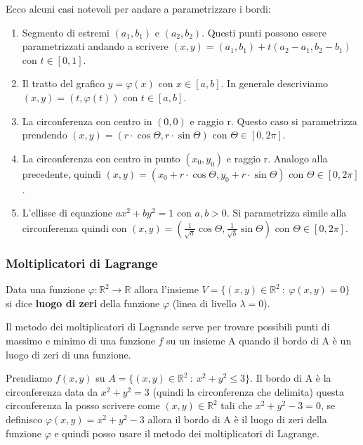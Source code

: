 \hspace{-15pt}Ecco alcuni casi notevoli per andare a parametrizzare i bordi:
\begin{enumerate}
    \item Segmento di estremi $(a_1,b_1)$ e $(a_2,b_2)$. Questi punti possono essere parametrizzati andando a scrivere $(x,y) = (a_1,b_1) + t(a_2-a_1, b_2 - b_1)$ con $t \in [0,1]$.
    \item Il tratto del grafico $y = \varphi(x)$ con $x \in [a,b]$. In generale descriviamo $(x,y) = (t, \varphi(t))$ con $t \in [a,b]$.
    \item La circonferenza con centro in $(0,0)$ e raggio r. Questo caso si parametrizza prendendo $(x,y) = (r \cdot \cos{\Theta}, r \cdot \sin{\Theta})$ con $\Theta \in [0,2\pi]$.
    \item La circonferenza con centro in punto $(x_0, y_0)$ e raggio r. Analogo alla precedente, quindi $(x,y) = (x_0 + r \cdot \cos{\Theta}, y_0 + r\cdot \sin{\Theta})$ con $\Theta \in [0,2\pi]$.
    \item L'ellisse di equazione $ax^2 + by^2 = 1$ con $a,b > 0$. Si parametrizza simile alla circonferenza quindi con $(x,y) = (\frac{1}{\sqrt{a}}\cos{\Theta}, \frac{1}{\sqrt{b}}\sin{\Theta})$ con $\Theta \in [0,2\pi]$.
\end{enumerate}
\subsubsection{Moltiplicatori di Lagrange}
\begin{definition}
Data una funzione $\varphi: \mathbb{R}^2 \to \mathbb{R}$ allora l'insieme $V = \{(x,y) \in \mathbb{R}^2 \::\: \varphi(x,y) = 0\}$ si dice \textbf{luogo di zeri} della funzione $\varphi$ (linea di livello $\lambda = 0$).
\end{definition}
\hspace{-15pt}Il metodo dei moltiplicatori di Lagrande serve per trovare possibili punti di massimo e minimo di una funzione $f$ su un insieme A quando il bordo di A è un luogo di zeri di una funzione.
\begin{example}
Prendiamo $f(x,y)$ su $A = \{(x,y) \in \mathbb{R}^2 \::\: x^2 + y^2 \leq 3\}$. Il bordo di A è la circonferenza data da $x^2 + y^2 = 3$ (quindi la circonferenza che delimita) questa circonferenza la posso scrivere come $(x,y) \in \mathbb{R}^2$ tali che $x^2 + y^2 - 3 = 0$, se definisco $\varphi(x,y) = x^2 + y^2 -3$ allora il bordo di A è il luogo di zeri della funzione $\varphi$ e quindi posso usare il metodo dei moltiplicatori di Lagrange.
\end{example}

